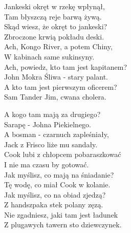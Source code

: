 \vspace{1em}
\begin{multicols}{2}
Jankeski okręt w rzekę wpłynął, \\
Tam błyszczą reje barwą żywą. \\

Skąd wiesz, że okręt to jankeski? \\
Zbroczone krwią pokładu deski. \\

Ach, Kongo River, a potem Chiny, \\
W kabinach same sukinsyny. \\

Ach, powiedz, kto tam jest kapitanem? \\
John Mokra Śliwa - stary palant. \\

A kto tam jest pierwszym oficerem? \\
Sam Tander Jim, cwana cholera. \\
\columnbreak

A kogo tam mają za drugiego? \\
Sarapę - Johna Piekielnego. \\

A bosman - czarnuch zapleśniały, \\
Jack z Frisco liże mu sandały. \\

Cook lubi z chłopcem pobaraszkować \\
I nie ma czasu by gotować. \\

Jak myślisz, co mają na śniadanie? \\
Tę wodę, co miał Cook w kolanie. \\

Jak myślisz, co na obiad zjedzą? \\
Z handszpaka stek polany zęzą. \\

Nie zgadniesz, jaki tam jest ładunek \\
Z plugawych tawern sto dziewczynek.
\end{multicols}